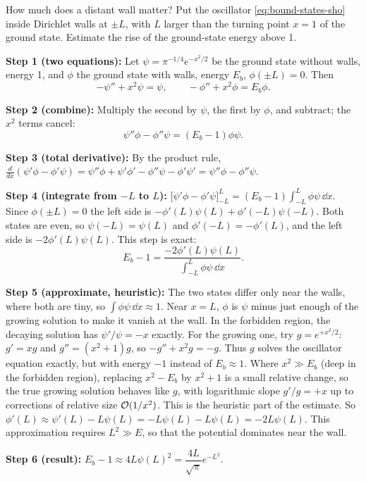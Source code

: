 \begin{sample}{How much does a distant wall matter?}
Put the oscillator \cref{eq:bound-states-sho} inside Dirichlet walls at $\pm L$, with $L$ larger than the turning point $x=1$ of the ground state. Estimate the rise of the ground-state energy above 1.

\textbf{Step 1 (two equations):} Let $\psi=\pi^{-1/4}e^{-x^2/2}$ be the ground state without walls, energy 1, and $\phi$ the ground state with walls, energy $E_b$, $\phi(\pm L)=0$. Then
\[
-\psi''+x^2\psi=\psi,\qquad -\phi''+x^2\phi=E_b\phi .
\]

\textbf{Step 2 (combine):} Multiply the second by $\psi$, the first by $\phi$, and subtract; the $x^2$ terms cancel:
\[
\psi''\phi-\phi''\psi=(E_b-1)\phi\psi .
\]

\textbf{Step 3 (total derivative):} By the product rule, $\frac{d}{dx}(\psi'\phi-\phi'\psi)=\psi''\phi+\psi'\phi'-\phi''\psi-\phi'\psi'=\psi''\phi-\phi''\psi$.

\textbf{Step 4 (integrate from $-L$ to $L$):} $\bigl[\psi'\phi-\phi'\psi\bigr]_{-L}^{L}=(E_b-1)\int_{-L}^{L}\phi\psi\,\dd x$. Since $\phi(\pm L)=0$ the left side is $-\phi'(L)\psi(L)+\phi'(-L)\psi(-L)$. Both states are even, so $\psi(-L)=\psi(L)$ and $\phi'(-L)=-\phi'(L)$, and the left side is $-2\phi'(L)\psi(L)$. This step is exact:
\begin{equation}
E_b-1=\frac{-2\phi'(L)\psi(L)}{\int_{-L}^{L}\phi\psi\,\dd x}.
\label{eq:bound-states-green}
\end{equation}

\textbf{Step 5 (approximate, heuristic):} The two states differ only near the walls, where both are tiny, so $\int\phi\psi\,\dd x\approx1$. Near $x=L$, $\phi$ is $\psi$ minus just enough of the growing solution to make it vanish at the wall. In the forbidden region, the decaying solution has $\psi'/\psi=-x$ exactly. For the growing one, try $g=e^{+x^2/2}$: $g'=xg$ and $g''=(x^2+1)g$, so $-g''+x^2g=-g$. Thus $g$ solves the oscillator equation exactly, but with energy $-1$ instead of $E_b\approx1$. Where $x^2\gg E_b$ (deep in the forbidden region), replacing $x^2-E_b$ by $x^2+1$ is a small relative change, so the true growing solution behaves like $g$, with logarithmic slope $g'/g=+x$ up to corrections of relative size $\mathcal{O}(1/x^2)$. This is the heuristic part of the estimate. So $\phi'(L)\approx\psi'(L)-L\psi(L)=-L\psi(L)-L\psi(L)=-2L\psi(L)$. This approximation requires $L^2\gg E$, so that the potential dominates near the wall.

\textbf{Step 6 (result):} $E_b-1\approx4L\psi(L)^2=\dfrac{4L}{\sqrt\pi}e^{-L^2}$.


\end{sample}
